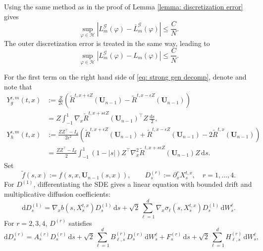 \documentclass[twoside,11pt]{article}
\newcommand{\dd}{\mathrm{d}}
\newcommand{\1}{\mathbf{1}}
\numberwithin{equation}{section}
\begin{document}
Using the same method as in the proof of Lemma \ref{lemma: discretization error} gives
\begin{equation}\label{eq: strong inner discretization bound}
    \sup_{\varphi\in\mathcal H}
    \left|L_m^{\mathscr G}(\varphi)-\bar L_m^{\mathscr G}(\varphi)\right|
    \le \frac{C}{N}.
\end{equation}
 The outer discretization error is treated in the same way, leading to
\begin{equation}\label{eq: strong discretization bound}
    \sup_{\varphi\in\mathcal H}
    \left|L_m^{\mathscr G}(\varphi)-L_m(\varphi)\right|
    \le \frac{C}{N}.
\end{equation}

For the first term on the right hand side of  \eqref{eq: strong gen decomp}, denote and note that
\begin{equation}\label{eq: strong central identities}
\begin{aligned}
    Y_g^{\epsilon,m}(t,x)
    &:= \frac{Z}{2\epsilon}
\left(
\tilde R^{t,x+\epsilon Z}(\mathbf U_{n-1})
-
\tilde R^{t,x-\epsilon Z}(\mathbf U_{n-1})
\right)\\
&= 
    Z\int_{-1}^{1}
    \nabla_x \tilde R^{t,x+s\epsilon Z}(\mathbf U_{n-1})^\top Z\,
    \frac{\dd s}{2},                                      \\
    Y_h^{\epsilon,m}(t,x)
    &:= \frac{ZZ^\top-I_d}{2\epsilon^2}
\left(
\tilde R^{t,x+\epsilon Z}(\mathbf U_{n-1})
+
\tilde R^{t,x-\epsilon Z}(\mathbf U_{n-1})
-
2\tilde R^{t,x}(\mathbf U_{n-1})
\right) \\
&= 
    \frac{ZZ^\top-I_d}{2}
    \int_{-1}^{1}(1-|s|)
    Z^\top\nabla_x^2 \tilde R^{t,x+s\epsilon Z}(\mathbf U_{n-1})Z\,
    \dd s .
\end{aligned}
\end{equation}
Set
\[
    \tilde f(s,x):=f(s,x,\mathbf U_{n-1}(s,x)),
    \qquad
    D_s^{(r)}:=\partial_x^r X_s^{t,x},\quad r=1,\ldots,4 .
\]
For $D^{(1)}$, differentiating the SDE gives a linear equation with bounded drift and multiplicative diffusion coefficients:
\[
    \dd D_s^{(1)}
    =
    \nabla_x b(s,X_s^{t,x})D_s^{(1)}\,\dd s
    +
    \sqrt2\sum_{\ell=1}^d
    \nabla_x\sigma_\ell(s,X_s^{t,x})D_s^{(1)}\,\dd W_s^\ell .
\]
For $r=2,3,4$, $D^{(r)}$ satisfies
\begin{equation}\label{eq: strong derivative flow sde}
    \dd D_s^{(r)}
    =
    A_s^{(r)}D_s^{(r)}\,\dd s
    +
    \sqrt2\sum_{\ell=1}^d B_{\ell,s}^{(r)}D_s^{(r)}\,\dd W_s^\ell
    +
    F_s^{(r)}\,\dd s
    +
    \sqrt2\sum_{\ell=1}^d H_{\ell,s}^{(r)}\,\dd W_s^\ell ,
\end{equation}
\end{document}
